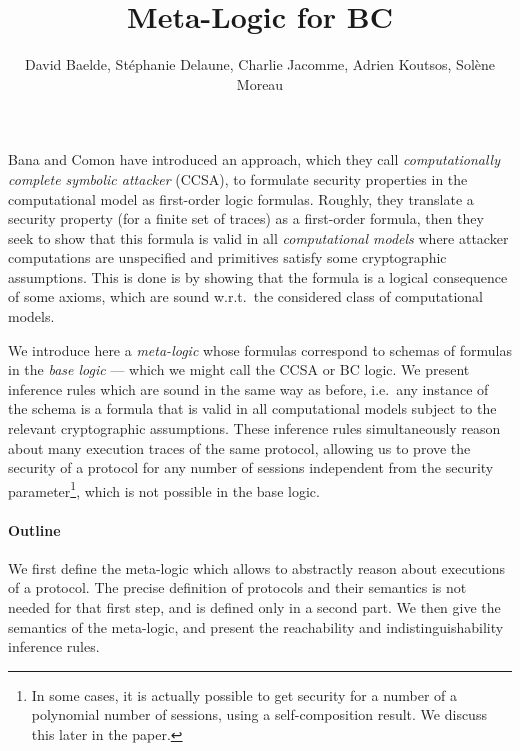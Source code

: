 \documentclass[a4paper]{article}
\theoremstyle{remark}
\begin{document}
\title{Meta-Logic for BC}

\author{David Baelde, Stéphanie Delaune,
  Charlie Jacomme, Adrien Koutsos, Solène Moreau}

\maketitle

\vfill

\tableofcontents

\vfill

Bana and Comon have introduced an approach, which they call
\emph{computationally complete symbolic attacker} (CCSA),
to formulate security properties in the computational model as first-order
logic formulas. Roughly, they translate a security property (for a finite set
of traces) as a first-order formula, then they seek to show that this formula
is valid in all \emph{computational models} where attacker computations
are unspecified and primitives satisfy some cryptographic assumptions. This is
done is by showing that the formula is a logical consequence of
some axioms, which are sound w.r.t.\ the considered class of computational
models.

We introduce here a \emph{meta-logic} whose formulas correspond to schemas
of formulas in the \emph{base logic}
--- which we might call the CCSA or BC logic. 
We present inference rules which are sound in the same way as before,
i.e.\ any instance of the schema is a formula that is valid in all
computational models subject to the relevant cryptographic assumptions.
These inference rules simultaneously reason about many execution
traces of the same protocol, allowing us to prove the security of a
protocol for any number of sessions independent from the security
parameter\footnote{In some cases, it is actually possible to get security for a number of a polynomial number of sessions, using a self-composition result. We discuss this later in the paper.}, which is not possible in the base logic.

\paragraph{Outline}
We first define the meta-logic which allows to  abstractly reason about
executions of a protocol. The precise definition of protocols and their
semantics is not needed for that first step, and is defined only in a
second part. We then give the semantics of the meta-logic, and present the reachability and indistinguishability inference rules.












\end{document}
